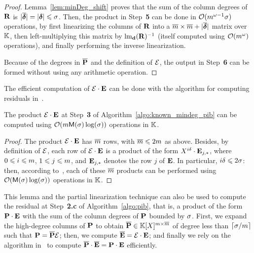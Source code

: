 \documentclass[preprint]{sig-alternate-05-2015}
\begin{document}
\begin{proof}
  Lemma~\ref{lem:minDeg_shift} proves that the sum of the column degrees of
  $\mat{R}$ is $\sshifts[\expand{\minDegs}] = \sshifts[\minDegs] \le \order$.
  Then, the product in Step~\textbf{5} can be done in
  $\bigO{\rdim^{\expmatmul-1} \order}$ operations, by first linearizing the
  columns of $\mat{R}$ into a $\expand{\rdim} \times \expand{\rdim} +
  \sshifts[\expand{\minDegs}]$ matrix over $\field$, then left-multiplying this
  matrix by $\leadingMat[{\shifts[d]}]{\mat{R}}^{-1}$ (itself computed using
  $\bigO{\rdim^\expmatmul}$ operations), and finally performing the inverse
  linearization.

  Because of the degrees in $\expand{\intBasis}$ and the definition of
  $\expandMat$, the output in Step~\textbf{6} can be formed without using any
  arithmetic operation.
\end{proof}

The efficient computation of $\expandMat \mul \evMat$ can be done with the
algorithm for computing residuals in~\cite[Section~6]{JeNeScVi15}.

\begin{lem}
  \label{lem:residual_expand}
  The product $\expandMat \mul \evMat$ at Step~\textbf{3} of
  Algorithm~\ref{algo:known_mindeg_pib} can be computed using $\bigO{\rdim
    \polmultime{\order} \log(\order)}$ operations in $\field$.
\end{lem}
\begin{proof}
  The product $\expandMat \mul \evMat$ has $\expand{\rdim}$ rows, with
  $\expand{\rdim} \le 2\rdim$ as above. Besides, by definition of $\expandMat$,
  each row of $\expandMat \mul \evMat$ is a product of the form $X^{i \degExp}
  \mul \matrow{\evMat}{j}$, where $0 \le i \le \rdim$, $1 \le j \le \rdim$, and
  $\matrow{\evMat}{j}$ denotes the row $j$ of $\evMat$. In particular, $i
  \degExp \le 2\order$: then, according to~\cite[Proposition~6.1]{JeNeScVi15},
  each of these $\expand{\rdim}$ products can be performed using
  $\bigO{\polmultime{\order} \log(\order)}$ operations in $\field$.
\end{proof}

This lemma and the partial linearization technique can also be used to compute
the residual at Step~\textbf{2.c} of Algorithm~\ref{algo:pib}, that is, a
product of the form $\mat{P} \mul \evMat$ with the sum of the column degrees of
$\mat{P}$ bounded by $\order$. First, we expand the high-degree columns of
$\mat{P}$ to obtain $\expand{\mat{P}} \in \polMatSpace[\rdim][\expand{\rdim}]$
of degree less than $\lceil\order/\rdim\rceil$ such that $\mat{P} =
\expand{\mat{P}} \expandMat$; then, we compute $\expand{\evMat} = \expandMat
\mul \evMat$; and finally we rely on the algorithm
in~\cite[Proposition~6.1]{JeNeScVi15} to compute $\expand{\mat{P}} \mul
\expand{\evMat} = \mat{P} \mul \evMat$ efficiently.
\end{document}
